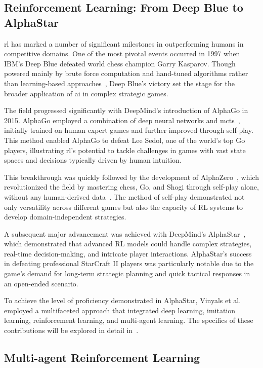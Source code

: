     \subsection*{Reinforcement Learning: From Deep Blue to AlphaStar}%

\Gls{rl} has marked a number of significant milestones in outperforming humans 
in competitive domains. One of the most pivotal events occurred in 1997 
when IBM's Deep Blue defeated world chess champion Garry Kasparov. Though 
powered mainly by brute force computation and hand-tuned algorithms rather than 
learning-based approaches~\cite{campbell2002}, Deep Blue's victory set the 
stage for the broader application of \gls{ai} in complex strategic games.

The field progressed significantly with DeepMind's introduction of AlphaGo 
in 2015. AlphaGo employed a combination of deep neural networks and 
\gls{mcts}~\cite{silver2016}, initially trained on human expert games and 
further improved through self-play.
This method enabled AlphaGo to defeat Lee Sedol, one of the world's top Go 
players, illustrating \gls{rl}'s potential to tackle challenges in games with 
vast state spaces and decisions typically driven by human intuition.

This breakthrough was quickly followed by the development of 
AlphaZero~\cite{silver2017}, which revolutionized the field by mastering chess,
Go, and Shogi through self-play alone, without any human-derived 
data~\cite{silver2017a}. The method of self-play demonstrated not only 
versatility across different games but also the capacity of RL systems to 
develop domain-independent strategies.

A subsequent major advancement was achieved with DeepMind's 
AlphaStar~\cite{vinyals2019}, 
which demonstrated that advanced RL models could handle complex strategies, 
real-time decision-making, and intricate player interactions. 
AlphaStar's success in defeating professional StarCraft II players
was particularly notable due to the game's demand for long-term strategic 
planning and quick tactical responses in an open-ended scenario.

To achieve the level of proficiency demonstrated in AlphaStar, 
Vinyals et al.~\cite{vinyals2019} employed a multifaceted approach 
that integrated deep learning, imitation learning, 
reinforcement learning, and multi-agent learning. 
The specifics of these contributions will be explored in detail 
in~.

    \subsection*{Multi-agent Reinforcement Learning}%

